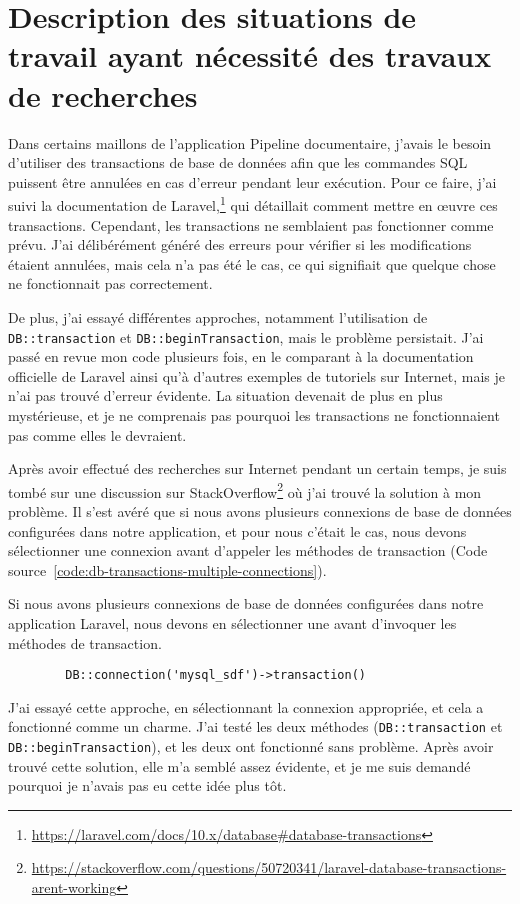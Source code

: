 \chapter{Description des situations de travail ayant nécessité des travaux de recherches}\label{ch:recherche}

Dans certains maillons de l'application Pipeline documentaire, j'avais le besoin d'utiliser des transactions de base de données afin que les commandes SQL puissent être annulées en cas d'erreur pendant leur exécution. Pour ce faire, j'ai suivi la documentation de Laravel,\cprotect\footnote{\url{https://laravel.com/docs/10.x/database#database-transactions}} qui détaillait comment mettre en œuvre ces transactions. Cependant, les transactions ne semblaient pas fonctionner comme prévu. J'ai délibérément généré des erreurs pour vérifier si les modifications étaient annulées, mais cela n'a pas été le cas, ce qui signifiait que quelque chose ne fonctionnait pas correctement.

De plus, j'ai essayé différentes approches, notamment l'utilisation de \Verb|DB::transaction| et \Verb|DB::beginTransaction|, mais le problème persistait. J'ai passé en revue mon code plusieurs fois, en le comparant à la documentation officielle de Laravel ainsi qu'à d'autres exemples de tutoriels sur Internet, mais je n'ai pas trouvé d'erreur évidente. La situation devenait de plus en plus mystérieuse, et je ne comprenais pas pourquoi les transactions ne fonctionnaient pas comme elles le devraient.

Après avoir effectué des recherches sur Internet pendant un certain temps, je suis tombé sur une discussion sur StackOverflow\footnote{\url{https://stackoverflow.com/questions/50720341/laravel-database-transactions-arent-working}} où j'ai trouvé la solution à mon problème. Il s'est avéré que si nous avons plusieurs connexions de base de données configurées dans notre application, et pour nous c'était le cas, nous devons sélectionner une connexion avant d'appeler les méthodes de transaction (Code source~\ref{code:db-transactions-multiple-connections}).

\begin{code}
    \caption{Si nous avons plusieurs connexions de base de données configurées dans notre application Laravel, nous devons en sélectionner une avant d'invoquer les méthodes de transaction.}
    \begin{verbatim}
        DB::connection('mysql_sdf')->transaction()
    \end{verbatim}
    \label{code:db-transactions-multiple-connections}
\end{code}

J'ai essayé cette approche, en sélectionnant la connexion appropriée, et cela a fonctionné comme un charme. J'ai testé les deux méthodes (\Verb|DB::transaction| et \Verb|DB::beginTransaction|), et les deux ont fonctionné sans problème. Après avoir trouvé cette solution, elle m'a semblé assez évidente, et je me suis demandé pourquoi je n'avais pas eu cette idée plus tôt.